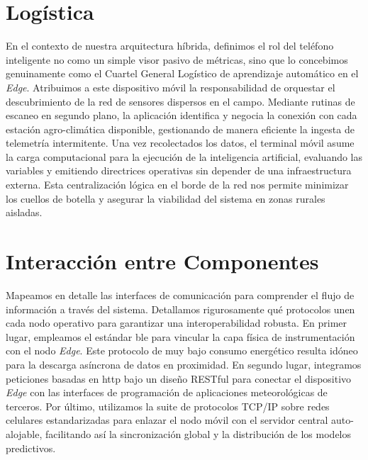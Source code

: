 \section{Logística}
En el contexto de nuestra arquitectura híbrida, definimos el rol del teléfono inteligente no como un simple visor pasivo de métricas, sino que lo concebimos genuinamente como el Cuartel General Logístico de aprendizaje automático en el \textit{Edge}. Atribuimos a este dispositivo móvil la responsabilidad de orquestar el descubrimiento de la red de sensores dispersos en el campo. Mediante rutinas de escaneo en segundo plano, la aplicación identifica y negocia la conexión con cada estación agro-climática disponible, gestionando de manera eficiente la ingesta de telemetría intermitente. Una vez recolectados los datos, el terminal móvil asume la carga computacional para la ejecución de la inteligencia artificial, evaluando las variables y emitiendo directrices operativas sin depender de una infraestructura externa. Esta centralización lógica en el borde de la red nos permite minimizar los cuellos de botella y asegurar la viabilidad del sistema en zonas rurales aisladas.

\section{Interacción entre Componentes}
Mapeamos en detalle las interfaces de comunicación para comprender el flujo de información a través del sistema. Detallamos rigurosamente qué protocolos unen cada nodo operativo para garantizar una interoperabilidad robusta. En primer lugar, empleamos el estándar \gls{ble} para vincular la capa física de instrumentación con el nodo \textit{Edge}. Este protocolo de muy bajo consumo energético resulta idóneo para la descarga asíncrona de datos en proximidad. En segundo lugar, integramos peticiones basadas en \gls{http} bajo un diseño RESTful para conectar el dispositivo \textit{Edge} con las interfaces de programación de aplicaciones meteorológicas de terceros. Por último, utilizamos la suite de protocolos TCP/IP sobre redes celulares estandarizadas para enlazar el nodo móvil con el servidor central auto-alojable, facilitando así la sincronización global y la distribución de los modelos predictivos.

